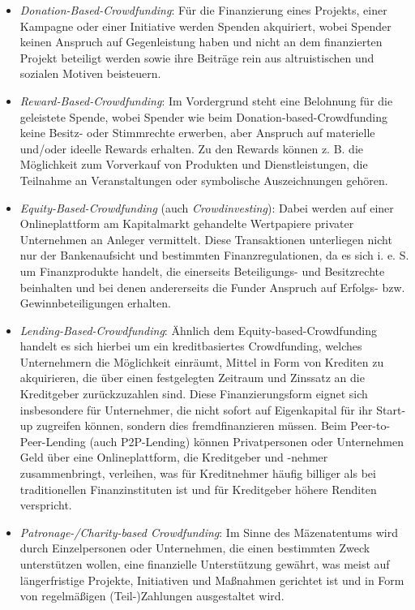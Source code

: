 \documentclass[
  letterpaper,
]{book}
\begin{document}
\begin{itemize}
\item
  \emph{Donation-Based-Crowdfunding}: Für die Finanzierung eines
  Projekts, einer Kampagne oder einer Initiative werden Spenden
  akquiriert, wobei Spender keinen Anspruch auf Gegenleistung haben und
  nicht an dem finanzierten Projekt beteiligt werden sowie ihre Beiträge
  rein aus altruistischen und sozialen Motiven beisteuern.
\item
  \emph{Reward-Based-Crowdfunding}: Im Vordergrund steht eine Belohnung
  für die geleistete Spende, wobei Spender wie beim
  Donation-based-Crowdfunding keine Besitz- oder Stimmrechte erwerben,
  aber Anspruch auf materielle und/oder ideelle Rewards erhalten. Zu den
  Rewards können z. B. die Möglichkeit zum Vorverkauf von Produkten und
  Dienstleistungen, die Teilnahme an Veranstaltungen oder symbolische
  Auszeichnungen gehören.
\item
  \emph{Equity-Based-Crowdfunding} (auch \emph{Crowdinvesting}): Dabei
  werden auf einer Onlineplattform am Kapitalmarkt gehandelte
  Wertpapiere privater Unternehmen an Anleger vermittelt. Diese
  Transaktionen unterliegen nicht nur der Bankenaufsicht und bestimmten
  Finanzregulationen, da es sich i. e. S. um Finanzprodukte handelt, die
  einerseits Beteiligungs- und Besitzrechte beinhalten und bei denen
  andererseits die Funder Anspruch auf Erfolgs- bzw. Gewinnbeteiligungen
  erhalten.
\item
  \emph{Lending-Based-Crowdfunding}: Ähnlich dem
  Equity-based-Crowdfunding handelt es sich hierbei um ein
  kreditbasiertes Crowdfunding, welches Unternehmern die Möglichkeit
  einräumt, Mittel in Form von Krediten zu akquirieren, die über einen
  festgelegten Zeitraum und Zinssatz an die Kreditgeber zurückzuzahlen
  sind. Diese Finanzierungsform eignet sich insbesondere für
  Unternehmer, die nicht sofort auf Eigenkapital für ihr Start-up
  zugreifen können, sondern dies fremdfinanzieren müssen. Beim
  Peer-to-Peer-Lending (auch P2P-Lending) können Privatpersonen oder
  Unternehmen Geld über eine Onlineplattform, die Kreditgeber und
  -nehmer zusammenbringt, verleihen, was für Kreditnehmer häufig
  billiger als bei traditionellen Finanzinstituten ist und für
  Kreditgeber höhere Renditen verspricht.
\item
  \emph{Patronage-/Charity-based Crowdfunding}: Im Sinne des
  Mäzenatentums wird durch Einzelpersonen oder Unternehmen, die einen
  bestimmten Zweck unterstützen wollen, eine finanzielle Unterstützung
  gewährt, was meist auf längerfristige Projekte, Initiativen und
  Maßnahmen gerichtet ist und in Form von regelmäßigen (Teil-)Zahlungen
  ausgestaltet wird.
\end{itemize}
\end{document}
